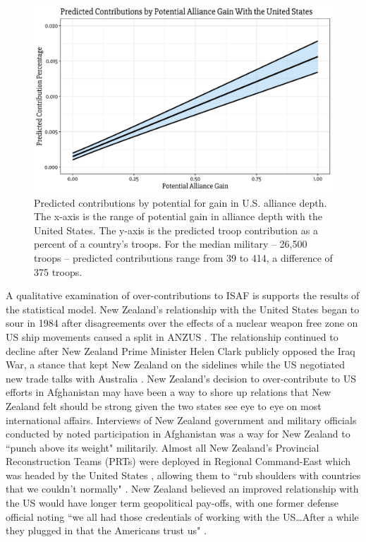 \documentclass[12pt,letterpaper]{article}
\begin{document}
		\begin{figure}[ht]
			\centering
			\includegraphics[scale = 0.75]{figures/pred_contr.pdf}
			\caption{Predicted contributions by potential for gain in U.S. alliance depth. The x-axis is the range of potential gain in alliance depth with the United States. The y-axis is the predicted troop contribution as a percent of a country's troops. For the median military -- 26,500 troops -- predicted contributions range from 39 to 414, a difference of 375 troops.}
		\end{figure}
	
		A qualitative examination of over-contributions to ISAF is supports the results of the statistical model. New Zealand's relationship with the United States began to sour in 1984 after disagreements over the effects of a nuclear weapon free zone on US ship movements caused a split in ANZUS \citep{catalinac_whynewzealand_2010}. The relationship continued to decline after New Zealand Prime Minister Helen Clark publicly opposed the Iraq War, a stance that kept New Zealand on the sidelines while the US negotiated new trade talks with Australia \citep{armstrong_alliesrewardedtrade_2003}. New Zealand's decision to over-contribute to US efforts in Afghanistan may have been a way to shore up relations that New Zealand felt should be strong given the two states see eye to eye on most international affairs. Interviews of New Zealand government and military officials conducted by \citet{wellings_narrativealignmentmisalignment_2018} noted participation in Afghanistan was a way for New Zealand to ``punch above its weight" militarily. Almost all New Zealand's Provincial Reconstruction Teams (PRTs) were deployed in Regional Command-East which was headed by the United States \citep[49]{auerswald_natoafghanistanfighting_2014}, allowing them to ``rub shoulders with countries that we couldn't normally" \citep{wellings_narrativealignmentmisalignment_2018}. New Zealand believed an improved relationship with the US would have longer term geopolitical pay-offs, with one former defense official noting ``we all had those credentials of working with the US\ldots After a while they plugged in that the Americans trust us" \citep[31]{wellings_narrativealignmentmisalignment_2018}.
	
\end{document}

